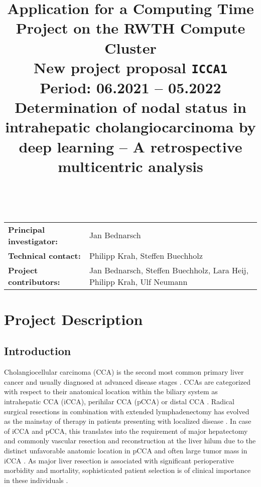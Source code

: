 \documentclass[12pt]{article}
\title{
Application for a Computing Time Project on the RWTH Compute Cluster\\[0.2em]\smaller{}New project proposal \texttt{ICCA1}\\Period: 06.2021 – 05.2022\\Determination of nodal status in intrahepatic cholangiocarcinoma by deep learning – A retrospective multicentric analysis }
\begin{document}
\maketitle
~\\
\begin{table}[H]
  \begin{center}
    \begin{tabular}{p{5cm} p{10cm}}
      \textbf{Principal investigator:} &  Jan Bednarsch\\
			\textbf{Technical contact:} & Philipp Krah, Steffen Buechholz\\
			\textbf{Project contributors:} & Jan Bednarsch, Steffen Buechholz, Lara Heij, Philipp Krah, Ulf Neumann
    \end{tabular}
  \end{center}
\end{table}

\newpage
% 

\section{Project Description}


\subsection{Introduction}
Cholangiocellular carcinoma (CCA) is the second most common primary liver cancer and usually diagnosed at advanced disease stages \cite{b1,b2}. CCAs are categorized with respect to their anatomical location within the biliary system as intrahepatic CCA (iCCA), perihilar CCA (pCCA) or distal CCA \cite{b1}. Radical surgical resections in combination with extended lymphadenectomy has evolved as the mainstay of therapy in patients presenting with localized disease \cite{b3,b4,b5}. In case of iCCA and pCCA, this translates into the requirement of major hepatectomy and commonly vascular resection and reconstruction at the liver hilum due to the distinct unfavorable anatomic location in pCCA and often large tumor mass in iCCA \cite{b6,b7,b8,b9,b10}. As major liver resection is associated with significant perioperative morbidity and mortality, sophisticated patient selection is of clinical importance in these individuals \cite{b6, b11, b12}.
\end{document}
